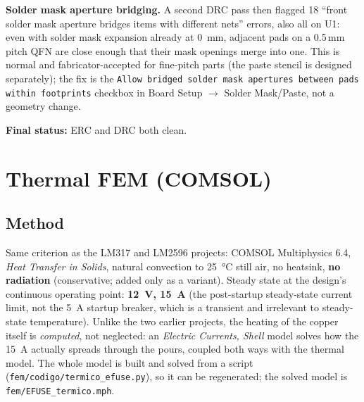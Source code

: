 \documentclass[11pt,letterpaper]{article}
\begin{document}
\textbf{Solder mask aperture bridging.} A second DRC pass then flagged 18 ``front solder mask aperture
bridges items with different nets'' errors, also all on U1: even with solder mask expansion already at
\SI{0}{\milli\meter}, adjacent pads on a 0.5\,mm pitch QFN are close enough that their mask openings merge
into one. This is normal and fabricator-accepted for fine-pitch parts (the paste stencil is designed
separately); the fix is the \texttt{Allow bridged solder mask apertures between pads within footprints}
checkbox in Board Setup $\to$ Solder Mask/Paste, not a geometry change.

\textbf{Final status:} ERC and DRC both clean.

\section{Thermal FEM (COMSOL)}
\label{sec:thermal}

\subsection{Method}

Same criterion as the LM317 and LM2596 projects: COMSOL Multiphysics 6.4, \textit{Heat Transfer in Solids},
natural convection to \SI{25}{\celsius} still air, no heatsink, \textbf{no radiation} (conservative; added
only as a variant). Steady state at the design's continuous operating point: \textbf{\SI{12}{\volt},
\SI{15}{\ampere}} (the post-startup steady-state current limit, not the \SI{5}{\ampere} startup breaker,
which is a transient and irrelevant to steady-state temperature). Unlike the two earlier projects, the
heating of the copper itself is \emph{computed}, not neglected: an \textit{Electric Currents, Shell} model
solves how the \SI{15}{\ampere} actually spreads through the pours, coupled both ways with the thermal
model. The whole model is built and solved from a script (\nolinkurl{fem/codigo/termico_efuse.py}), so it
can be regenerated; the solved model is \nolinkurl{fem/EFUSE_termico.mph}.
\end{document}
